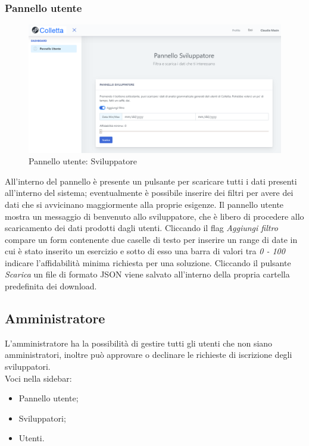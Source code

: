     	\subsubsection{Pannello utente}
    				\begin{figure}[H]
				\centering
				\includegraphics[width=17cm]{sez/img/sviluppatore/panelloutente.PNG}
				\caption{Pannello utente: Sviluppatore}\label{fig:1}
			\end{figure}
			 All'interno del pannello è presente un pulsante per scaricare tutti i dati presenti all'interno del sistema; eventualmente è possibile inserire dei filtri per avere dei dati che si avvicinano maggiormente alla proprie esigenze.
    	  Il pannello utente mostra un messaggio di benvenuto allo sviluppatore, che è libero di procedere allo scaricamento dei dati prodotti dagli utenti.
    	 Cliccando il flag \textit{Aggiungi filtro} compare un form contenente due caselle di testo per inserire un range di date in cui è stato inserito un esercizio e sotto di esso una barra di valori tra \textit{0 - 100} indicare l'affidabilità minima richiesta per una soluzione.
    	 Cliccando il pulsante \textit{Scarica} un file di formato JSON viene salvato all'interno della propria cartella predefinita dei download.

	\newpage
	\subsection{Amministratore}
	L'amministratore ha la possibilità di gestire tutti gli utenti che non siano amministratori, inoltre può approvare o declinare le richieste di iscrizione degli sviluppatori.
		  \\Voci nella sidebar:
			\begin{itemize}
				\item Pannello utente;
				\item Sviluppatori;
				\item Utenti.
			\end{itemize}



